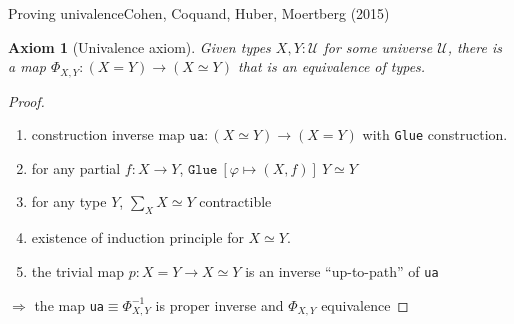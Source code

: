 \documentclass[english]{beamer}
\newtheorem{axiom}[theorem]{Axiom}
\newcommand{\fig}[2]{
    \begin{figure}\begin{center}\texttt{[image: figures/\#1]}\caption{#2\label{#1}}\end{center}
    \end{figure}}
\begin{document}
  

  


  
 




\begin{frame}{Proving univalence}{Cohen, Coquand, Huber, Moertberg (2015)}

\begin{axiom}[Univalence axiom]
 Given types $X,Y : \mathcal{U}$ for some universe $\mathcal{U}$, there is a map  $\Phi_{X,Y}: (X=Y) \rightarrow (X \simeq Y)$ that is an equivalence of types. 
\end{axiom}


 

\begin{proof}

\begin{enumerate}

\item construction inverse map $\texttt{ua} : (X\simeq Y) \rightarrow (X = Y)$ with \texttt{Glue} construction.

\item for any partial $f : X \rightarrow Y$, $\texttt{Glue} \ [\varphi \mapsto (X, f)] \ Y \simeq Y$

\item for any type $Y$, $\sum_{X} X \simeq Y$ contractible

\item existence of induction principle for $X\simeq Y$.

\item the trivial map $p : X = Y \rightarrow X \simeq Y$ is an inverse ``up-to-path'' of \texttt{ua}
%  
%  
 
 \end{enumerate}
 
    $\Rightarrow$ the map \texttt{ua}$\equiv \Phi_{X,Y}^{-1}$ is proper inverse and $\Phi_{X,Y}$ equivalence
\end{proof} 

\end{frame}
\end{document}
